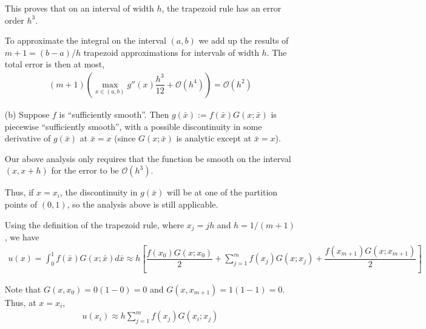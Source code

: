 \documentclass[10pt]{article}
\begin{document}
\begin{solution}[Solution]
\begin{enumerate}
        This proves that on an interval of width \( h \), the trapezoid rule has an error order \( h^3 \).

        To approximate the integral on the interval \( (a,b) \) we add up the results of \( m+1 = (b-a)/h \) trapezoid approximations for intervals of width \( h \). The total error is then at most,
        \begin{align*}
            (m+1) \left( \max_{x\in(a,b)} g''(x) \dfrac{h^3}{12} + \mathcal{O}(h^4) \right) = \mathcal{O}(h^2) \tag*{\qed}
        \end{align*}


    \item[(b)]
        Suppose \( f \) is ``sufficiently smooth''. Then \( g(\bar{x}):=f(\bar{x})G(x;\bar{x}) \) is piecewise ``sufficiently smooth'', with a possible discontinuity in some derivative of \( g(\bar{x}) \) at \( \bar{x} = x \) (since \( G(x;\bar{x}) \) is analytic except at \( \bar{x} = x \)).

        Our above analysis only requires that the function be smooth on the interval \( (x,x+h) \) for the error to be \( \mathcal{O}(h^3) \). 
        
        Thus, if \( x = x_i \), the discontinuity in \( g(\bar{x}) \) will be at one of the partition points of \( (0,1) \), so the analysis above is still applicable.


        Using the definition of the trapezoid rule,
        where \( x_j = jh \) and \( h=1/(m+1) \), we have
        \begin{align*}
            u(x) = \int_{0}^{1} f(\bar{x})G(x;\bar{x}) d\bar{x}
            \approx
            h \left[ \dfrac{f(x_0)G(x;x_0)}{2} + \sum_{j=1}^{m}f(x_j)G(x;x_j) + \dfrac{f(x_{m+1})G(x;x_{m+1})}{2} \right]
        \end{align*}

        Note that \( G(x,x_0) = 0(1-0) = 0 \) and \( G(x,x_{m+1}) = 1(1-1) = 0 \). Thus, at \( x=x_i \),
        \begin{align*}
            u(x_i) \approx h \sum_{j=1}^{m}f(x_j)G(x_i;x_j) 
        \end{align*}


\end{enumerate}
\end{solution}
\end{document}
